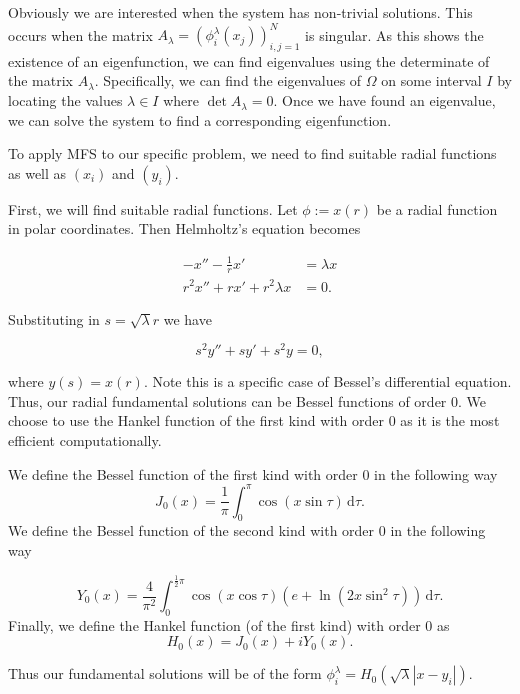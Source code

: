 Obviously we are interested when the system has non-trivial solutions.
This occurs when the matrix $A_{\lambda} = (\phi_{i}^{\lambda}(x_{j}))_{i,j = 1}^N$ is singular.
As this shows the existence of an eigenfunction, we can find eigenvalues using the determinate of the matrix $A_{\lambda}$.
Specifically, we can find the eigenvalues of $\Omega$ on some interval $I$ by locating the values $\lambda \in I$ where $\det A_{\lambda} = 0$.
Once we have found an eigenvalue, we can solve the system to find a corresponding eigenfunction.


To apply MFS to our specific problem, we need to find suitable radial functions as well as $(x_{i})$ and $(y_{i})$.

First, we will find suitable radial functions.
Let $\phi := x(r)$ be a radial function in polar coordinates.
Then Helmholtz's equation becomes

  \begin{align*}
    -x'' - \frac{1}{r} x' &= \lambda x \\
    r^2 x'' + r x' + r^2 \lambda x &= 0.
  \end{align*}

Substituting in $s = \sqrt{\lambda} r$ we have

\[
  s^2 y'' + s y' + s^2 y = 0
,\] 

where $y(s) = x(r)$.
Note this is a specific case of Bessel's differential equation.
Thus, our radial fundamental solutions can be Bessel functions of order $0$.
We choose to use the Hankel function of the first kind with order $0$ as it is the most efficient computationally.

\begin{definition}
  We define the Bessel function of the first kind with order $0$ in the following way
  \[
    J_{0}(x) = \frac{1}{\pi} \int_{ 0}^{\pi} \! \cos(x \sin \tau) \, \mathrm{d}\tau 
  .\] 
  We define the Bessel function of the second kind with order $0$ in the following way

  \[
    Y_{0}(x) = \frac{4}{\pi^2} \int_{0}^{\frac{1}{2}\pi} \! \cos(x \cos \tau) \left( e + \ln \left( 2x \sin^2 \tau \right) \right) \, \mathrm{d}\tau 
  .\] 
  Finally, we define the Hankel function (of the first kind) with order $0$ as
  \[
  H_{0}(x) = J_{0}(x) + i Y_{0}(x)
  .\] 
\end{definition}

Thus our fundamental solutions will be of the form $\phi_{i}^\lambda = H_{0} ( \sqrt{\lambda} |x - y_{i} | ) $.

